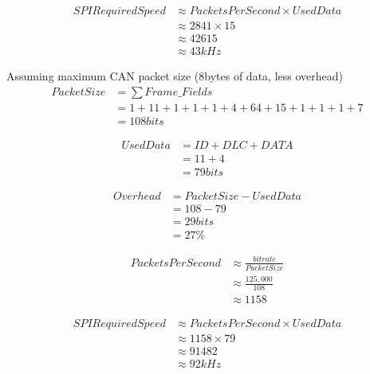 \documentclass[11pt]{report} %
\begin{document}
		\begin{equation}
		\begin{aligned}
		SPIRequiredSpeed &\approx PacketsPerSecond \times UsedData\\
		&\approx 2841 \times 15\\
		&\approx 42615\\
		&\approx 43kHz
		\end{aligned}
		\end{equation}

		Assuming maximum CAN packet size (8bytes of data, less overhead)
		\begin{equation}
		\begin{aligned}
		PacketSize &= \sum{Frame\_Fields}\\
		&= 1 + 11 + 1 + 1 + 1 + 4 + 64 + 15 + 1 + 1 + 1 + 7 \\
		&= 108bits
		\end{aligned}
		\end{equation}

		\begin{equation}
		\begin{aligned}
		UsedData &= ID + DLC + DATA\\
		&= 11 + 4\\
		&= 79bits
		\end{aligned}
		\end{equation}

		\begin{equation}
		\begin{aligned}
		Overhead &= PacketSize - UsedData\\
		&= 108 - 79\\
		&= 29bits\\
		&= 27\%
		\end{aligned}
		\end{equation}

		\begin{equation}
		\begin{aligned}
		PacketsPerSecond &\approx \frac{bit rate}{PacketSize}\\
		&\approx \frac{125,000}{108}\\
		&\approx 1158
		\end{aligned}
		\end{equation}

		\begin{equation}
		\begin{aligned}
		SPIRequiredSpeed &\approx PacketsPerSecond \times UsedData\\
		&\approx 1158 \times 79\\
		&\approx 91482\\
		&\approx 92kHz
		\end{aligned}
		\end{equation}
	
\end{document}
